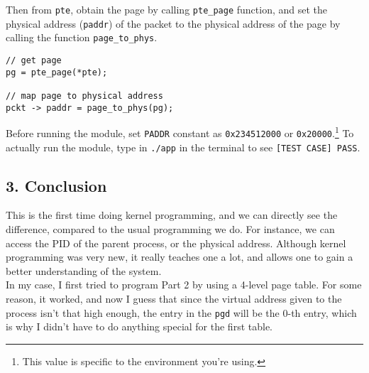 \documentclass[12pt]{report}
\begin{document}
Then from \texttt{pte}, obtain the page by calling \texttt{pte\_page} function, and set the physical address (\texttt{paddr}) of the packet to the physical address of the page by calling the function \texttt{page\_to\_phys}.
\begin{lstlisting}[style=Cstyle]
// get page
pg = pte_page(*pte);

// map page to physical address
pckt -> paddr = page_to_phys(pg);
\end{lstlisting}
Before running the module, set \texttt{PADDR} constant as \texttt{0x234512000} or \texttt{0x20000}.\footnote{This value is specific to the environment you're using.}
To actually run the module, type in \texttt{./app} in the terminal to see \texttt{[TEST CASE] PASS}.
\subsection*{3. Conclusion}
This is the first time doing kernel programming, and we can directly see the difference, compared to the usual programming we do. For instance, we can access the PID of the parent process, or the physical address. Although kernel programming was very new, it really teaches one a lot, and allows one to gain a better understanding of the system.\\
In my case, I first tried to program Part 2 by using a 4-level page table. For some reason, it worked, and now I guess that since the virtual address given to the process isn't that high enough, the entry in the \texttt{pgd} will be the 0-th entry, which is why I didn't have to do anything special for the first table.\\ 
\end{document}
